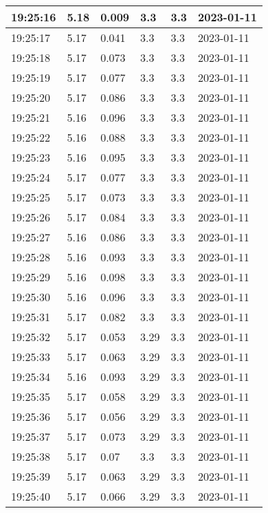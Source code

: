 \begin{longtable}{|l|l|l|l|l|l|}
        19:25:16 & 5.18 & 0.009 & 3.3 & 3.3 & 2023-01-11 \\ \hline
        19:25:17 & 5.17 & 0.041 & 3.3 & 3.3 & 2023-01-11 \\ \hline
        19:25:18 & 5.17 & 0.073 & 3.3 & 3.3 & 2023-01-11 \\ \hline
        19:25:19 & 5.17 & 0.077 & 3.3 & 3.3 & 2023-01-11 \\ \hline
        19:25:20 & 5.17 & 0.086 & 3.3 & 3.3 & 2023-01-11 \\ \hline
        19:25:21 & 5.16 & 0.096 & 3.3 & 3.3 & 2023-01-11 \\ \hline
        19:25:22 & 5.16 & 0.088 & 3.3 & 3.3 & 2023-01-11 \\ \hline
        19:25:23 & 5.16 & 0.095 & 3.3 & 3.3 & 2023-01-11 \\ \hline
        19:25:24 & 5.17 & 0.077 & 3.3 & 3.3 & 2023-01-11 \\ \hline
        19:25:25 & 5.17 & 0.073 & 3.3 & 3.3 & 2023-01-11 \\ \hline
        19:25:26 & 5.17 & 0.084 & 3.3 & 3.3 & 2023-01-11 \\ \hline
        19:25:27 & 5.16 & 0.086 & 3.3 & 3.3 & 2023-01-11 \\ \hline
        19:25:28 & 5.16 & 0.093 & 3.3 & 3.3 & 2023-01-11 \\ \hline
        19:25:29 & 5.16 & 0.098 & 3.3 & 3.3 & 2023-01-11 \\ \hline
        19:25:30 & 5.16 & 0.096 & 3.3 & 3.3 & 2023-01-11 \\ \hline
        19:25:31 & 5.17 & 0.082 & 3.3 & 3.3 & 2023-01-11 \\ \hline
        19:25:32 & 5.17 & 0.053 & 3.29 & 3.3 & 2023-01-11 \\ \hline
        19:25:33 & 5.17 & 0.063 & 3.29 & 3.3 & 2023-01-11 \\ \hline
        19:25:34 & 5.16 & 0.093 & 3.29 & 3.3 & 2023-01-11 \\ \hline
        19:25:35 & 5.17 & 0.058 & 3.29 & 3.3 & 2023-01-11 \\ \hline
        19:25:36 & 5.17 & 0.056 & 3.29 & 3.3 & 2023-01-11 \\ \hline
        19:25:37 & 5.17 & 0.073 & 3.29 & 3.3 & 2023-01-11 \\ \hline
        19:25:38 & 5.17 & 0.07 & 3.3 & 3.3 & 2023-01-11 \\ \hline
        19:25:39 & 5.17 & 0.063 & 3.29 & 3.3 & 2023-01-11 \\ \hline
        19:25:40 & 5.17 & 0.066 & 3.29 & 3.3 & 2023-01-11 \\ \hline

\end{longtable}
